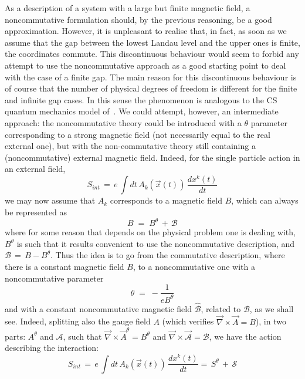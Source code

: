\documentclass[a4paper,12pt]{article}
\begin{document}
As a description of a system with a large but finite magnetic
field, a
noncommutative formulation should, by the previous reasoning, be a
good approximation. However, it is unpleasant to realise that, in
fact, as soon as we assume that the gap between the lowest Landau
level and the upper ones is finite, the coordinates commute. This
discontinuous behaviour would seem to forbid any attempt to use the
noncommutative approach as a good starting point to deal with the
case
of a finite gap. The main reason for this discontinuous behaviour
is
of course that the number of physical degrees of freedom is
different
for the finite and infinite gap cases. In this sense the phenomenon
is
analogous to the CS quantum mechanics model of~\cite{jackiw}.  We
could attempt, however, an intermediate approach: the
noncommutative
theory could be introduced with a $\theta$ parameter corresponding
to a
strong magnetic field (not necessarily equal to the real external
one), but with the non-commutative theory still containing a
(noncommutative) external magnetic field. Indeed, for the single
particle action in an external field,
\begin{equation}
  \label{eq:sintg}
S_{int} \,=\, e\, \int dt \,A_k({\vec x}(t))\, \frac{dx^k(t)}{dt} 
\end{equation}
we may now assume that $A_k$ corresponds to a magnetic field $B$,
which can always be represented as
\begin{equation}
  \label{eq:decomp}
B \;=\; B^\theta \,+\, {\mathcal B} 
\end{equation}
where for some reason that depends on the physical problem one is
dealing with, $B^\theta$ is such that it results convenient to use
the
noncommutative description, and ${\mathcal B}\,=\,B-B^\theta$. Thus
the
idea is to go from the commutative description, where there is a
constant magnetic field $B$, to a noncommutative one with a
noncommutative parameter
\begin{equation}
  \label{eq:deftheta}
\theta \;=\; - \frac{1}{e B^\theta}
\end{equation}
and with a constant noncommutative magnetic field ${\hat {\mathcal
    B}}$, related to ${\mathcal B}$, as we shall see.  Indeed,
splitting also the gauge field $A$ (which verifies
$\vec{\nabla}\times {\vec A}
= B$), in two parts: $A^\theta$ and ${\mathcal A}$, such that
${\vec
  \nabla}\times{\vec A}^\theta = B^\theta$ and ${\vec
\nabla}\times{\vec {\mathcal A}} = {\mathcal
  B}$, we have the action describing the interaction:
\begin{equation}
  \label{eq:sintg1}
S_{int} \,=\, e\, \int dt \,A_k({\vec x}(t))\, \frac{dx^k(t)}{dt} 
=\,S^\theta \,+\, {\mathcal S} 
\end{equation}
\end{document}
